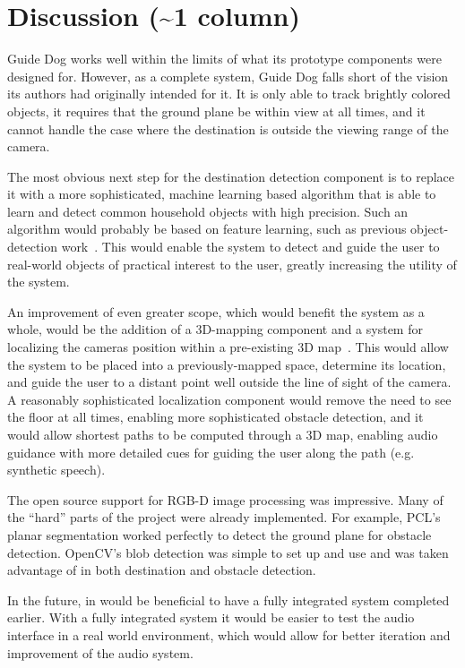 \section{Discussion (\textasciitilde 1 column)}
\label{sec:discussion}

Guide Dog works well within the limits of what its prototype components were
designed for. However, as a complete system, Guide Dog falls short of the 
vision its authors had originally intended for it. It is only able to track
brightly colored objects, it requires that the ground plane be within view
at all times, and it cannot handle the case where the destination is outside
the viewing range of the camera. 

The most obvious next step for the destination detection component is to
replace it with a more sophisticated, machine learning based algorithm that
is able to learn and detect common household objects with high precision.
Such an algorithm would probably be based on feature learning, such as
previous object-detection work~\cite{lai_icra12}.
This would enable the system to detect and guide the user to real-world
objects of practical interest to the user, greatly increasing the
utility of the system.

An improvement of even greater scope, which would benefit the system as
a whole, would be the addition of a 3D-mapping component and a system
for localizing the cameras position within a pre-existing 3D map~\cite{Du:2011:IMI:2030112.2030123}. This
would allow the system to be placed into a previously-mapped space,
determine its location, and guide the user to a distant point well
outside the line of sight of the camera. A reasonably sophisticated 
localization component would remove the need to see the floor at all
times, enabling more sophisticated obstacle detection, and it would 
allow shortest paths to be computed through a 3D map, enabling audio
guidance with more detailed cues for guiding the user along the path
(e.g. synthetic speech).

The open source support for RGB-D image processing was impressive. Many of the
``hard'' parts of the project were already implemented. For example, PCL's
planar segmentation worked perfectly to detect the ground plane for obstacle
detection. OpenCV's blob detection was simple to set up and use and was taken
advantage of in both destination and obstacle detection.

In the future, in would be beneficial to have a fully integrated system
completed earlier. With a fully integrated system it would be easier to test the
audio interface in a real world environment, which would allow for better
iteration and improvement of the audio system.
